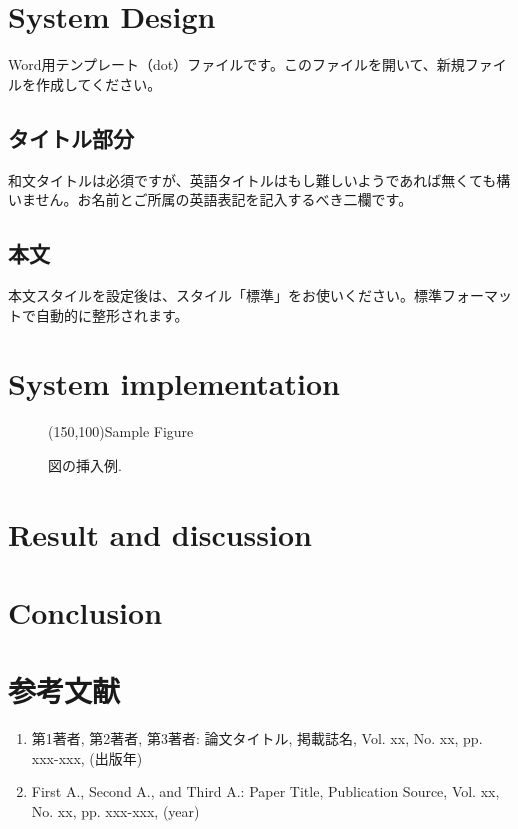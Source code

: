 \documentclass[a4j]{article}
\begin{document}
\section{System Design}
Word用テンプレート（dot）ファイルです。このファイルを開いて、新規ファイルを作成してください。

\subsection{タイトル部分}
和文タイトルは必須ですが、英語タイトルはもし難しいようであれば無くても構いません。お名前とご所属の英語表記を記入するべき二欄です。

\subsection{本文}
本文スタイルを設定後は、スタイル「標準」をお使いください。標準フォーマットで自動的に整形されます。
\section{System implementation}
\begin{figure}[htbp]
    \centering
    \framebox(150,100){Sample Figure}
    \caption{図の挿入例.}
    \label{fig:example1}
\end{figure}
\section{Result and discussion}
\section{Conclusion}

\section*{参考文献}

\begin{enumerate}
    \item 第1著者, 第2著者, 第3著者: 論文タイトル, 掲載誌名, Vol. xx, No. xx, pp. xxx-xxx, (出版年)
    \item First A., Second A., and Third A.: Paper Title, Publication Source, Vol. xx, No. xx, pp. xxx-xxx, (year)
\end{enumerate}
\end{document}
